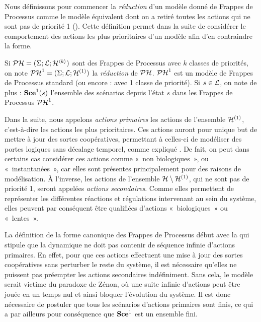 Nous définissons pour commencer la \emph{réduction} d'un modèle donné de Frappes de Processus
comme le modèle équivalent dont on a retiré toutes les actions qui ne sont pas de priorité 1
().
Cette définition permet dans la suite de considérer le comportement des actions les plus prioritaires
d'un modèle afin d'en contraindre la forme.

\begin{definition}
  Si $\PH = (\PHs; \PHl; \PHh^{\langle k \rangle})$ sont des Frappes de Processus avec $k$
  classes de priorités, on note $\reduction[\PH] = (\PHs; \PHl; \PHh^{(1)})$
  la \emph{réduction} de $\PH$.
  $\reduction$ est un modèle de Frappes de Processus standard
  (ou encore : avec 1 classe de priorité).
  Si $s \in \PHl$, on note de plus : $\reduction[\Sce](s)$ l'ensemble des scénarios
  depuis l'état $s$ dans les Frappes de Processus $\reduction$.
\end{definition}


Dans la suite, nous appelons \emph{actions primaires} les actions de l'ensemble $\PHh^{(1)}$,
c'est-à-dire les actions les plus prioritaires.
Ces actions auront pour unique but de mettre à jour des sortes coopératives, permettant
à celles-ci de modéliser des portes logiques sans décalage temporel,
comme expliqué .
De fait, on peut dans certains cas considérer ces actions comme «~non biologiques~»,
ou «~instantanées~»,
car elles sont présentes principalement pour des raisons de modélisation.
À l'inverse, les actions de l'ensemble $\PHh \setminus \PHh^{(1)}$, qui ne sont pas de priorité 1,
seront appelées \emph{actions secondaires}.
Comme elles permettent de représenter les différentes réactions et régulations intervenant au sein du
système, elles peuvent par conséquent être qualifiées d'actions «~biologiques~» ou «~lentes~».

La définition de la forme canonique des Frappes de Processus début avec la
 qui stipule que la dynamique ne doit pas contenir de séquence infinie
d'actions primaires.
En effet, pour que ces actions effectuent une mise à jour des sortes coopératives sans perturber
le reste du système, il est nécessaire qu'elles ne puissent pas préempter les actions secondaires
indéfiniment.
Sans cela, le modèle serait victime du paradoxe de Zénon,
où une suite infinie d'actions peut être jouée en un temps nul et ainsi
bloquer l'évolution du système.
Il est donc nécessaire de postuler que tous les scénarios d'actions primaires sont finis,
ce qui a par ailleurs pour conséquence que $\reductionsce$ est un ensemble fini.

